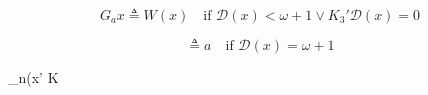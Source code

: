 $$G_a x \triangleq W(x) \quad \text{if } \mathcal{D}(x) < \omega + 1 \vee K_3' \mathcal{D}(x) = 0$$

$$\triangleq a \quad \text{if } \mathcal{D}(x) = \omega + 1$$

$$\triangleq {}_n(x' K
